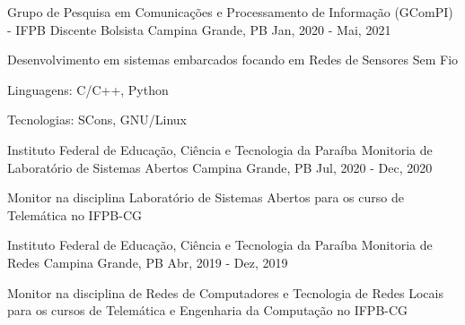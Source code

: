 \begin{cventries}
  \cventry
  {Grupo de Pesquisa em Comunicações e Processamento de Informação (GComPI) - IFPB} %
  {Discente Bolsista} %
  {Campina Grande, PB} %
  {Jan, 2020 - Mai, 2021} %
  {
    \begin{cvitems} %
      \item {Desenvolvimento em sistemas embarcados focando em Redes de Sensores Sem Fio}
      \item {Linguagens: C/C++, Python}
      \item {Tecnologias: SCons, GNU/Linux}
    \end{cvitems}
  }

  \cventry
  {Instituto Federal de Educação, Ciência e Tecnologia da Paraíba}
  {Monitoria de Laboratório de Sistemas Abertos}
  {Campina Grande, PB}
  {Jul, 2020 - Dec, 2020}
  {
    \begin{cvitems}
      \item {Monitor na disciplina Laboratório de Sistemas Abertos para os curso de Telemática no IFPB-CG}
    \end{cvitems}
  }

  \cventry
  {Instituto Federal de Educação, Ciência e Tecnologia da Paraíba}
  {Monitoria de Redes}
  {Campina Grande, PB}
  {Abr, 2019 - Dez, 2019}
  {
    \begin{cvitems}
      \item {Monitor na disciplina de Redes de Computadores e Tecnologia de Redes Locais para os cursos de Telemática e Engenharia da Computação no IFPB-CG}
    \end{cvitems}
  }

\end{cventries}
